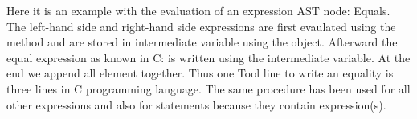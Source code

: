 Here it is an example with the evaluation of an expression AST node: Equals.
The left-hand side and right-hand side expressions are first evaulated using the  method and
are stored in intermediate variable using the  object.
Afterward the equal expression as known in C:  is written using the intermediate variable.
At the end we append all element together. Thus one Tool line to write an equality is
three lines in C programming language.
\newline
The same procedure has been used for all other expressions and also for statements
because they contain expression(s).
\newline
